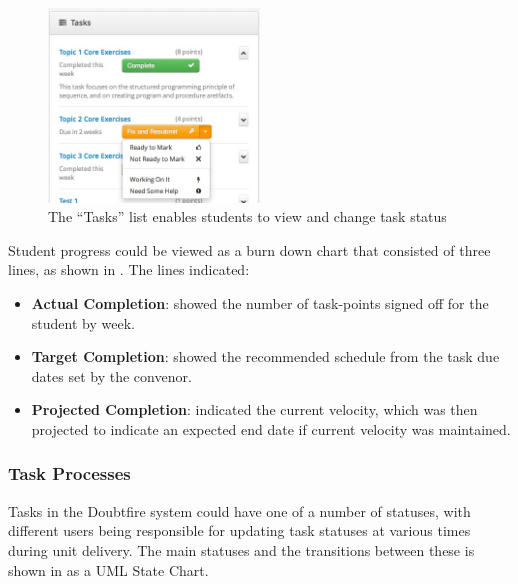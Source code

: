\begin{figure}[thbp]
  \centering
  \includegraphics[width=0.5\textwidth]{StudentTasks}
  \caption{The ``Tasks'' list enables students to view and change task status}
  \label{fig:task_list}
\end{figure}

Student progress could be viewed as a burn down chart that consisted of three lines, as shown in . The lines indicated:
\begin{itemize}[noitemsep,nolistsep]
  \item \textbf{Actual Completion}: showed the number of task-points signed off for the student by week.
  \item \textbf{Target Completion}: showed the recommended schedule from the task due dates set by the convenor.
  \item \textbf{Projected Completion}: indicated the current velocity, which was then projected to indicate an expected end date if current velocity was maintained.
\end{itemize}


\subsubsection{Task Processes} %
\label{sub:task_processes}

Tasks in the Doubtfire system could have one of a number of statuses, with different users being responsible for updating task statuses at various times during unit delivery. The main statuses and the transitions between these is shown in  as a UML State Chart. 

